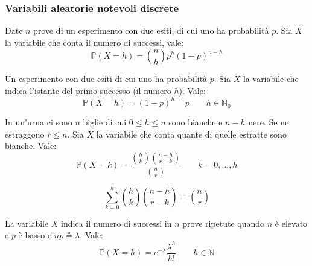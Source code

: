 \subsubsection{Variabili aleatorie notevoli discrete}
\begin{definition}
	Date $n$ prove di un esperimento con due esiti, di cui uno ha probabilità $p$. Sia $X$ la variabile che conta il numero di successi, vale:
	\begin{equation}
		\mathbb{P}(X=h) = \binom{n}{h}p^h(1-p)^{n-h}
	\end{equation}
\end{definition}
\begin{definition}
	Un esperimento con due esiti di cui uno ha probabilità $p$. Sia $X$ la variabile che indica l'istante del primo successo (il numero $h$). Vale:
	\begin{equation}
		\mathbb{P}(X=h) = (1-p)^{h-1}p\quad\quad h \in \mathbb{N}_0
	\end{equation}
\end{definition}
\begin{definition}
	In un'urna ci sono $n$ biglie di cui $0 \leq h \leq n$ sono bianche e $n-h$ nere. Se ne estraggono $r \leq n$. Sia $X$ la variabile che conta quante di quelle estratte sono bianche. Vale:
	\begin{equation}
		\mathbb{P}(X = k) = \frac{\binom{h}{k} \binom{n-h}{r-k}}{\binom{n}{r}} \quad\quad k=0,\ldots, h
	\end{equation}
\end{definition}
\begin{definition}
	\begin{equation}
		\sum_{k=0}^{h} \binom{h}{k}\binom{n-h}{r-k} = \binom{n}{r}
	\end{equation}
\end{definition}
\begin{definition}
	La variabile $X$ indica il numero di successi in $n$ prove ripetute quando $n$ è elevato e $p$ è basso e $np \circeq \lambda$. Vale:
	\begin{equation}
		\mathbb{P}(X=h)=e^{-\lambda}\frac{\lambda^h}{h!} \quad\quad h \in \mathbb{N}
	\end{equation}
\end{definition}
